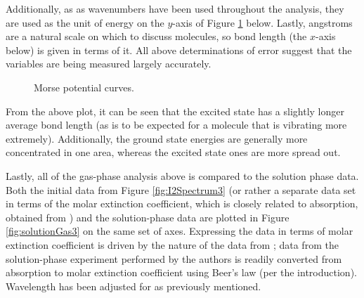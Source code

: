 \documentclass[../labs.tex]{subfiles}
\begin{document}
Additionally, as as wavenumbers have been used throughout the analysis, they are used as the unit of energy on the $y$-axis of Figure \ref{fig:Morse3} below. Lastly, angstroms are a natural scale on which to discuss molecules, so bond length (the $x$-axis below) is given in terms of it. All above determinations of error suggest that the variables are being measured largely accurately.
\begin{figure}[H]
    \centering
    \caption{Morse potential curves.}
    \label{fig:Morse3}
\end{figure}
From the above plot, it can be seen that the excited state has a slightly longer average bond length (as is to be expected for a molecule that is vibrating more extremely). Additionally, the ground state energies are generally more concentrated in one area, whereas the excited state ones are more spread out.\par
Lastly, all of the gas-phase analysis above is compared to the solution phase data. Both the initial data from Figure \ref{fig:I2Spectrum3} (or rather a separate data set in terms of the molar extinction coefficient, which is closely related to absorption, obtained from \textcite{bib:gasI2}) and the solution-phase data are plotted in Figure \ref{fig:solutionGas3} on the same set of axes. Expressing the data in terms of molar extinction coefficient is driven by the nature of the data from \textcite{bib:gasI2}; data from the solution-phase experiment performed by the authors is readily converted from absorption to molar extinction coefficient using Beer's law (per the introduction). Wavelength has been adjusted for as previously mentioned.
\end{document}
